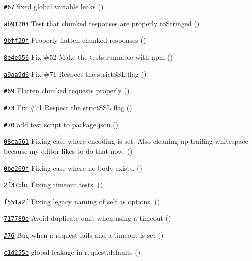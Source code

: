 \begin{DoxyItemize}
\item \href{https://github.com/mikeal/request/pull/67}{\tt \#67} fixed global variable leaks ()
\item \href{https://github.com/mikeal/request/commit/ab9120495a89536c7152e3cdf17d684323b40474}{\tt ab91204} Test that chunked responses are properly to\+String\textquotesingle{}ed ()
\item \href{https://github.com/mikeal/request/commit/9bff39fa485f28d7f1754e72f026418ca1186783}{\tt 9bff39f} Properly flatten chunked responses ()
\item \href{https://github.com/mikeal/request/commit/8e4e95654391c71c22933ffd422fdc82d20ac059}{\tt 8e4e956} Fix \#52 Make the tests runnable with npm ()
\item \href{https://github.com/mikeal/request/commit/a9aa9d6d50ef0481553da3e50e40e723a58de10a}{\tt a9aa9d6} Fix \#71 Respect the strict\+S\+S\+L flag ()
\item \href{https://github.com/mikeal/request/pull/69}{\tt \#69} Flatten chunked requests properly ()
\item \href{https://github.com/mikeal/request/pull/73}{\tt \#73} Fix \#71 Respect the strict\+S\+S\+L flag ()
\item \href{https://github.com/mikeal/request/pull/70}{\tt \#70} add test script to package.\+json ()
\item \href{https://github.com/mikeal/request/commit/08ca5617e0d8bcadee98f10f94a49cbf2dd02862}{\tt 08ca561} Fixing case where encoding is set. Also cleaning up trailing whitespace because my editor likes to do that now. ()
\item \href{https://github.com/mikeal/request/commit/0be269f7d9da6c3a14a59d5579546fee9d038960}{\tt 0be269f} Fixing case where no body exists. ()
\item \href{https://github.com/mikeal/request/commit/2f37bbc51ff84c3c28ae419138a19bd33a9f0103}{\tt 2f37bbc} Fixing timeout tests. ()
\item \href{https://github.com/mikeal/request/commit/f551a2f02a87994249c2fd37dc8f20a29e8bf529}{\tt f551a2f} Fixing legacy naming of self as options. ()
\item \href{https://github.com/mikeal/request/commit/717789ec9f690e9d5216ce1c27688eef822940cc}{\tt 717789e} Avoid duplicate emit when using a timeout ()
\item \href{https://github.com/mikeal/request/pull/76}{\tt \#76} Bug when a request fails and a timeout is set ()
\item \href{https://github.com/mikeal/request/commit/c1d255e5bcc5791ab69809913fe6d917ab93c8b7}{\tt c1d255e} global leakage in request.\+defaults ()

\end{DoxyItemize}
